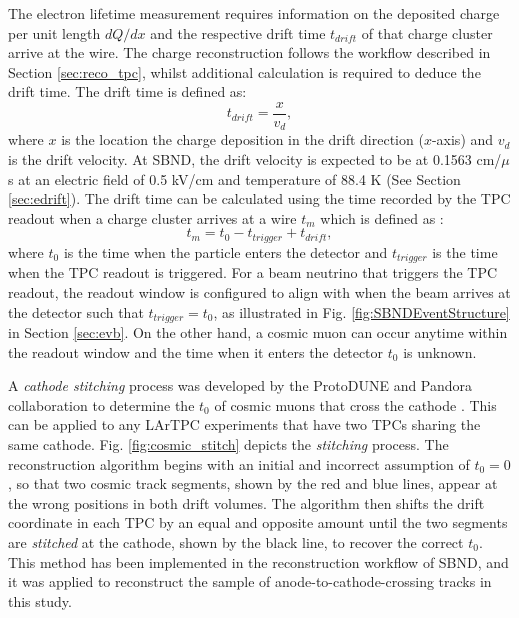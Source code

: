 The electron lifetime measurement requires information on the deposited charge per unit length $dQ/dx$ and the respective drift time $t_{drift}$ of that charge cluster arrive at the wire.
The charge reconstruction follows the workflow described in Section \ref{sec:reco_tpc}, whilst additional calculation is required to deduce the drift time.     
The drift time is defined as:
\begin{equation}
        t_{drift} = \frac{x}{v_{d}},
\end{equation}
where $x$ is the location the charge deposition in the drift direction ($x$-axis) and $v_{d}$ is the drift velocity.
At SBND, the drift velocity is expected to be at 0.1563 cm/$\mu$s at an electric field of 0.5 kV/cm and temperature of 88.4 K (See Section \ref{sec:edrift}).
The drift time can be calculated using the time recorded by the TPC readout when a charge cluster arrives at a wire $t_{m}$ which is defined as \cite{pandora_protodune}:
\begin{equation}
\label{eq:t0}
        t_{m} = t_{0} - t_{trigger} + t_{drift},
\end{equation}
where $t_{0}$ is the time when the particle enters the detector and $t_{trigger}$ is the time when the TPC readout is triggered.
For a beam neutrino that triggers the TPC readout, the readout window is configured to align with when the beam arrives at the detector such that $t_{trigger} = t_{0}$, as illustrated in Fig. \ref{fig:SBNDEventStructure} in Section \ref{sec:evb}.
On the other hand, a cosmic muon can occur anytime within the readout window and the time when it enters the detector $t_{0}$ is unknown.

A \textit{cathode stitching} process was developed by the ProtoDUNE and Pandora collaboration to determine the $t_{0}$ of cosmic muons that cross the cathode \cite{pandora_protodune}.
This can be applied to any LArTPC experiments that have two TPCs sharing the same cathode.
Fig. \ref{fig:cosmic_stitch} depicts the \textit{stitching} process.
The reconstruction algorithm begins with an initial and incorrect assumption of $t_{0} = 0$ \cite{pandora_protodune}, so that two cosmic track segments, shown by the red and blue lines, appear at the wrong positions in both drift volumes.
The algorithm then shifts the drift coordinate in each TPC by an equal and opposite amount until the two segments are \textit{stitched} at the cathode, shown by the black line, to recover the correct $t_{0}$.
This method has been implemented in the reconstruction workflow of SBND, and it was applied to reconstruct the sample of anode-to-cathode-crossing tracks in this study.

